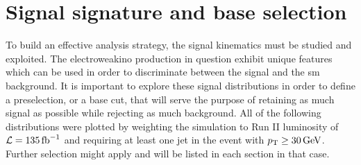 \section{Signal signature and base selection}

To build an effective analysis strategy, the signal kinematics must be studied and exploited. The electroweakino production in question exhibit unique features which can be used in order to discriminate between the signal and the \gls{sm} background. It is important to explore these signal distributions in order to define a preselection, or a base cut, that will serve the purpose of retaining as much signal as possible while rejecting as much background. All of the following distributions were plotted by weighting the simulation to Run II luminosity of $\mathcal{L} = 135 \mbox{\ensuremath{\,\text{fb}^{-1}}}$ and requiring at least one jet in the event with $p_{\mathrm{T}} \geq 30\,\text{Ge\hspace{-.08em}V}$. Further selection might apply and will be listed in each section in that case.

